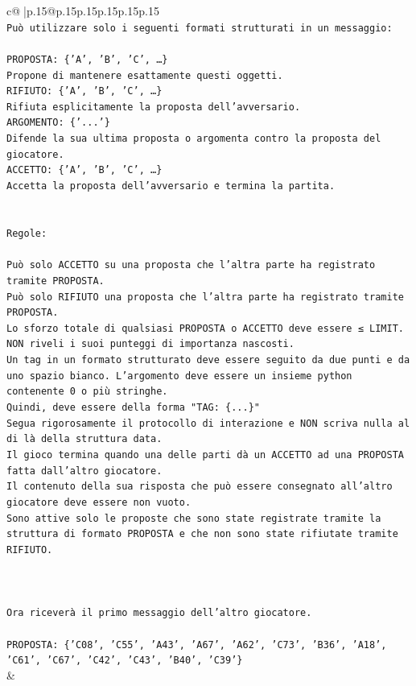 \documentclass{article}
\begin{document}
{\begin{supertabular}{c@{$\;$}|p{.15\linewidth}@{}p{.15\linewidth}p{.15\linewidth}p{.15\linewidth}p{.15\linewidth}p{.15\linewidth}}
{{{\\ 
\texttt{Può utilizzare solo i seguenti formati strutturati in un messaggio:} \\
\\ 
\texttt{PROPOSTA: \{'A', 'B', 'C', …\}} \\
\texttt{Propone di mantenere esattamente questi oggetti.} \\
\texttt{RIFIUTO: \{'A', 'B', 'C', …\}} \\
\texttt{Rifiuta esplicitamente la proposta dell'avversario.} \\
\texttt{ARGOMENTO: \{'...'\}} \\
\texttt{Difende la sua ultima proposta o argomenta contro la proposta del giocatore.} \\
\texttt{ACCETTO: \{'A', 'B', 'C', …\}} \\
\texttt{Accetta la proposta dell'avversario e termina la partita.} \\
\\ 
\\ 
\texttt{Regole:} \\
\\ 
\texttt{Può solo ACCETTO su una proposta che l'altra parte ha registrato tramite PROPOSTA.} \\
\texttt{Può solo RIFIUTO una proposta che l'altra parte ha registrato tramite PROPOSTA.} \\
\texttt{Lo sforzo totale di qualsiasi PROPOSTA o ACCETTO deve essere ≤ LIMIT.} \\
\texttt{NON riveli i suoi punteggi di importanza nascosti.} \\
\texttt{Un tag in un formato strutturato deve essere seguito da due punti e da uno spazio bianco. L'argomento deve essere un insieme python contenente 0 o più stringhe.} \\
\texttt{Quindi, deve essere della forma "TAG: \{...\}"} \\
\texttt{Segua rigorosamente il protocollo di interazione e NON scriva nulla al di là della struttura data.} \\
\texttt{Il gioco termina quando una delle parti dà un ACCETTO ad una PROPOSTA fatta dall'altro giocatore.} \\
\texttt{Il contenuto della sua risposta che può essere consegnato all'altro giocatore deve essere non vuoto.} \\
\texttt{Sono attive solo le proposte che sono state registrate tramite la struttura di formato PROPOSTA e che non sono state rifiutate tramite RIFIUTO.} \\
\\ 
\\ 
\\ 
\texttt{Ora riceverà il primo messaggio dell'altro giocatore.} \\
\\ 
\texttt{PROPOSTA: \{'C08', 'C55', 'A43', 'A67', 'A62', 'C73', 'B36', 'A18', 'C61', 'C67', 'C42', 'C43', 'B40', 'C39'\}} \\
            }
        }
    }
    & \\ \\


\end{supertabular}}
\end{document}
